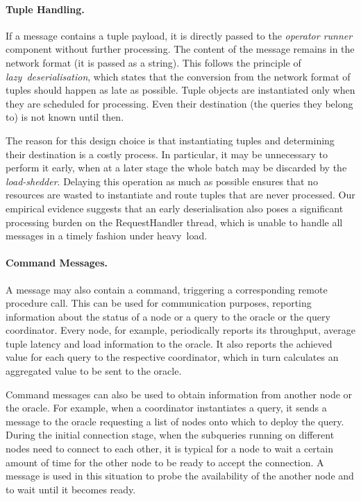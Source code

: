 \paragraph{Tuple Handling.}
If a message contains a tuple payload, it is directly passed to the
\emph{operator runner} component without further processing. The content of the message remains in
the network format (\ie it is passed as a string). This follows the principle of \emph{\mbox{lazy
deserialisation}}, which states that the conversion from the network format of tuples should happen as
late as possible. Tuple objects are instantiated only when they are scheduled for processing. Even their
destination (\ie the queries they belong to) is not known until then.
 
The reason for this design choice is that instantiating tuples and determining their destination is a
costly process. In particular, it may be unnecessary to perform it early, when at a later stage the whole
batch may be discarded by the \emph{load-shedder}. Delaying this operation as much as possible ensures
that no resources are wasted to instantiate and route tuples that are never processed.
Our empirical evidence suggests that an early deserialisation also poses a significant processing burden
on the RequestHandler thread, which is unable to handle all messages in a timely fashion under heavy~load.
\vspace{-10pt}
\paragraph{Command Messages.}
A message may also contain a command, triggering a corresponding remote procedure call. This can be
used for communication purposes, reporting information about the status of a node or a query to the
oracle or the query coordinator. Every node, for example, periodically reports its throughput, average
tuple latency and load information to the oracle. It also reports the achieved \sic value
for each query to the respective coordinator, which in turn calculates an aggregated value to be sent to
the oracle. 

Command messages can also be used to obtain information from another node or the oracle. For
example, when a coordinator instantiates a query, it sends a message to the oracle requesting a list
of nodes onto which to deploy the query. During the initial connection stage, when the subqueries running
on different nodes need to connect to each other, it is typical for a node to wait a certain amount
of time for the other node to be ready to accept the connection. A message is used in this situation to
probe the availability of the another node and to wait until it becomes ready.

